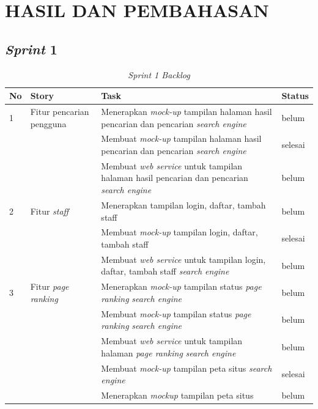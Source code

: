
\chapter{HASIL DAN PEMBAHASAN}

\section{\textit{Sprint} 1}

\begin{longtable}{@{}|p{0.5cm}|p{4cm}|p{6cm}|p{2cm}|@{}}
	\caption{\textit{Sprint 1 Backlog}}\\	
	\hline
	\textbf{No} & \textbf{Story} & \textbf{Task} & \textbf{Status} \\
	\hline
	1 & Fitur pencarian pengguna & Menerapkan \textit{mock-up} tampilan halaman hasil pencarian dan pencarian \textit{search engine} & belum \\
	\cline{3-4}
	& & Membuat \textit{mock-up} tampilan halaman hasil pencarian dan pencarian \textit{search engine} & selesai \\
	\cline{3-4}
	& & Membuat \textit{web service} untuk tampilan halaman hasil pencarian dan pencarian \textit{search engine} & belum \\
	\cline{1-4}
	2 & Fitur \textit{staff} & Menerapkan tampilan login, daftar, tambah staff & belum \\
	\cline{3-4}
	& & Membuat \textit{mock-up} tampilan login, daftar, tambah staff & selesai \\
	\cline{3-4}
	& & Membuat \textit{web service} untuk tampilan login, daftar, tambah staff \textit{search engine} & belum \\
	\cline{1-4}  
	3 & Fitur \textit{page ranking} & Menerapkan \textit{mock-up} tampilan status \textit{page ranking} \textit{search engine} & belum \\
	\cline{3-4}
	& & Membuat \textit{mock-up} tampilan status \textit{page ranking} \textit{search engine} & belum \\
	\cline{3-4}
	& & Membuat \textit{web service} untuk tampilan halaman \textit{page ranking} \textit{search engine} & belum \\
	\cline{3-4}
	
	& & Membuat \textit{mock-up} tampilan peta situs \textit{search engine} & selesai \\
	\cline{1-4}
	\hline
	\hline
	& & Menerapkan \textit{mockup} tampilan peta situs & belum \\
	\cline{1-4}
	
\end{longtable}


